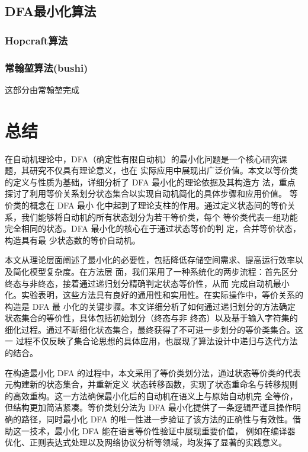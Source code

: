 \documentclass{article}
\begin{document}
\subsection{DFA最小化算法}
\subsubsection{Hopcraft算法}

\subsubsection{常翰堃算法(bushi)}
    这部分由常翰堃完成


\newpage
\section{总结}

在自动机理论中，DFA（确定性有限自动机）的最小化问题是一个核心研究课题，其研究不仅具有理论意义，也在
实际应用中展现出广泛价值。本文以等价类的定义与性质为基础，详细分析了 DFA 最小化的理论依据及其构造方
法，重点探讨了利用等价关系划分状态集合以实现自动机简化的具体步骤和应用价值。 等价类的概念在 DFA 最小
化中起到了理论支柱的作用。通过定义状态间的等价关系，我们能够将自动机的所有状态划分为若干等价类，每个
等价类代表一组功能完全相同的状态。DFA 最小化的核心在于通过状态等价的判 定，合并等价状态，构造具有最
少状态数的等价自动机。
   
   本文从理论层面阐述了最小化的必要性，包括降低存储空间需求、提高运行效率以及简化模型复杂度。在方法层
   面，我们采用了一种系统化的两步流程：首先区分终态与非终态，接着通过递归划分精确判定状态等价性，从而
   完成自动机最小化。实验表明，这些方法具有良好的通用性和实用性。在实际操作中，等价关系的构造是 DFA 最
   小化的关键步骤。本文详细分析了如何通过递归划分的方法确定状态集合的等价性，具体包括初始划分（终态与非
   终态）以及基于输入字符集的细化过程。通过不断细化状态集合，最终获得了不可进一步划分的等价类集合。这一
   过程不仅反映了集合论思想的具体应用，也展现了算法设计中递归与迭代方法的结合。

   在构造最小化 DFA 的过程中，本文采用了等价类划分法，通过状态等价类的代表元构建新的状态集合，并重新定义
   状态转移函数，实现了状态重命名与转移规则的高效重构。这一方法确保最小化后的自动机在语义上与原始自动机完
   全等价，但结构更加简洁紧凑。等价类划分法为 DFA 最小化提供了一条逻辑严谨且操作明确的路径，同时最小化 DFA
   的唯一性进一步验证了该方法的正确性与有效性。借助这一技术，最小化 DFA 能在语言等价性验证中展现重要价值，
   例如在编译器优化、正则表达式处理以及网络协议分析等领域，均发挥了显著的实践意义。
\end{document}
